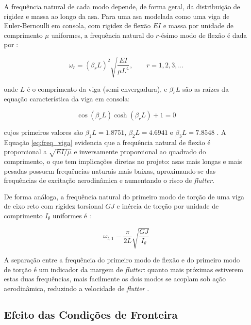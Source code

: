 \documentclass[11pt,twoside,a4paper]{report}
\begin{document}
A frequência natural de cada modo depende, de forma geral, da distribuição de rigidez e massa ao longo da asa. Para uma asa modelada como uma viga de Euler-Bernoulli em consola, com rigidez de flexão $EI$ e massa por unidade de comprimento $\mu$ uniformes, a frequência natural do $r$-ésimo modo de flexão é dada por \cite{Rao2011}:

\begin{equation}
    \omega_r = \left(\beta_r L\right)^2 \sqrt{\frac{EI}{\mu L^4}}, 
    \qquad r = 1, 2, 3, \ldots
    \label{eq:freq_viga}
\end{equation}

\noindent onde $L$ é o comprimento da viga (semi-envergadura), e $\beta_r L$ são as raízes da equação característica da viga em consola:

\begin{equation}
    \cos(\beta_r L)\cosh(\beta_r L) + 1 = 0
    \label{eq:char_cantilever}
\end{equation}

cujos primeiros valores são $\beta_1 L = 1.8751$, $\beta_2 L = 4.6941$ e $\beta_3 L = 7.8548$ \cite{Rao2011}. A Equação \eqref{eq:freq_viga} evidencia que a frequência natural de flexão é proporcional a $\sqrt{EI/\mu}$ e inversamente proporcional ao quadrado do comprimento, o que tem implicações diretas no projeto: asas mais longas e mais pesadas possuem frequências naturais mais baixas, aproximando-se das frequências de excitação aerodinâmica e aumentando o risco de \textit{flutter}.

De forma análoga, a frequência natural do primeiro modo de torção de uma viga de eixo reto com rigidez torsional $GJ$ e inércia de torção por unidade de comprimento $I_\theta$ uniformes é \cite{Bisplinghoff1996}:

\begin{equation}
    \omega_{t,1} = \frac{\pi}{2L}\sqrt{\frac{GJ}{I_\theta}}
    \label{eq:freq_torcao}
\end{equation}

A separação entre a frequência do primeiro modo de flexão e do primeiro modo de torção é um indicador da margem de \textit{flutter}: quanto mais próximas estiverem estas duas frequências, mais facilmente os dois modos se acoplam sob ação aerodinâmica, reduzindo a velocidade de \textit{flutter} \cite{Fung1993, Dowell2004}.

\subsection{Efeito das Condições de Fronteira}
\end{document}
